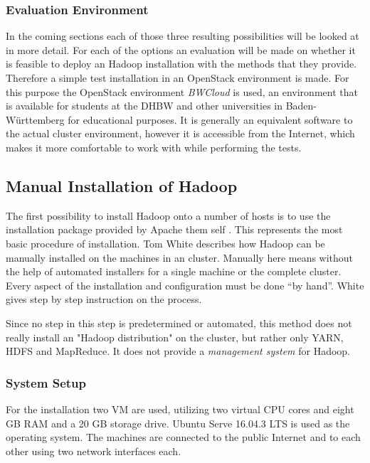 \subsubsection{Evaluation Environment}
In the coming sections each of those three resulting possibilities will be looked at in more detail.
For each of the options an evaluation will be made on whether it is 
feasible to deploy an Hadoop installation with the methods that they provide.
Therefore a simple test installation in an OpenStack environment is made.
For this purpose the OpenStack environment \emph{BWCloud} 
is used, an environment that is available for students at the \ac{DHBW} 
and other universities in Baden-Württemberg for educational purposes. 
It is generally an equivalent software to the actual cluster environment, 
however it is accessible from the Internet, 
which makes it more comfortable to work with while performing the tests.

\subsection{Manual Installation of Hadoop}
\label{sec:design:manualinstall}

The first possibility to install Hadoop onto a number of hosts 
is to use the installation package provided by Apache them self .
This represents the most basic procedure of installation.
Tom White \autocite[][Appendix A]{white2015hadoop} describes how Hadoop can be manually installed on the machines in an cluster. 
Manually here means without the help of automated installers for a single machine or the complete cluster. 
Every aspect of the installation and configuration must be done \enquote{by hand}.
White gives step by step instruction on the process.

Since no step in this step is predetermined or automated, this method does not really install an "Hadoop distribution" on the cluster, but rather only \ac{YARN}, \ac{HDFS} and MapReduce.
It does not provide a \emph{management system} for Hadoop.

\subsubsection{System Setup}
For the installation two \acs{VM} are used, utilizing two virtual \ac{CPU} cores and eight \ac{GB} \ac{RAM} and a 20 \ac{GB} storage drive. 
Ubuntu Serve 16.04.3 \ac{LTS} is used as the operating system. 
The machines are connected to the public Internet and to each other using two network interfaces each.

